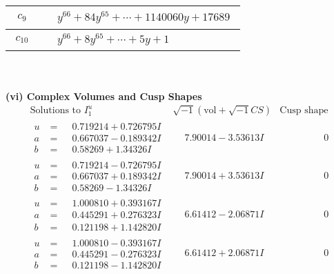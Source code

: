 \documentclass[1p]{elsarticle_modified}
\theoremstyle{definition}
\newcommand{\I}{\sqrt{-1}}
\begin{document}
\begin{tabular}{m{50pt}|m{274pt}}
\hline $$\begin{aligned}c_{9}\end{aligned}$$&$\begin{aligned}
&y^{66}+84 y^{65}+\cdots+1140060 y+17689
\end{aligned}$\\
\hline $$\begin{aligned}c_{10}\end{aligned}$$&$\begin{aligned}
&y^{66}+8 y^{65}+\cdots+5 y+1
\end{aligned}$\\
\hline
\end{tabular}\\~\\
\newpage\flushleft \textbf{(vi) Complex Volumes and Cusp Shapes}
$$\begin{array}{c|c|c}  
\text{Solutions to }I^u_{1}& \I (\text{vol} + \sqrt{-1}CS) & \text{Cusp shape}\\
 \hline 
\begin{aligned}
u &= \phantom{-}0.719214 + 0.726795 I \\
a &= \phantom{-}0.667037 - 0.189342 I \\
b &= \phantom{-}0.58269 + 1.34326 I\end{aligned}
 & \phantom{-}7.90014 - 3.53613 I & \phantom{-0.000000 } 0 \\ \hline\begin{aligned}
u &= \phantom{-}0.719214 - 0.726795 I \\
a &= \phantom{-}0.667037 + 0.189342 I \\
b &= \phantom{-}0.58269 - 1.34326 I\end{aligned}
 & \phantom{-}7.90014 + 3.53613 I & \phantom{-0.000000 } 0 \\ \hline\begin{aligned}
u &= \phantom{-}1.000810 + 0.393167 I \\
a &= \phantom{-}0.445291 + 0.276323 I \\
b &= \phantom{-}0.121198 + 1.142820 I\end{aligned}
 & \phantom{-}6.61412 - 2.06871 I & \phantom{-0.000000 } 0 \\ \hline\begin{aligned}
u &= \phantom{-}1.000810 - 0.393167 I \\
a &= \phantom{-}0.445291 - 0.276323 I \\
b &= \phantom{-}0.121198 - 1.142820 I\end{aligned}
 & \phantom{-}6.61412 + 2.06871 I & \phantom{-0.000000 } 0 \\ \hline\begin{aligned}

\end{aligned}
\end{array}$$
\end{document}
